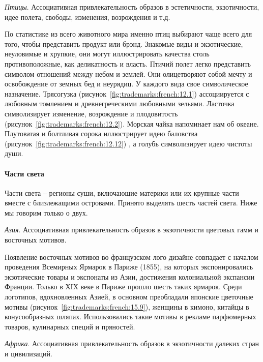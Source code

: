 \emph{Птицы}. Ассоциативная привлекательность образов в эстетичности,
  экзотичности, идее полета, свободы, изменения, возрождения и т.д.

  По статистике из всего животного мира именно птиц выбирают чаще всего для
  того, чтобы представить продукт или брэнд. Знакомые виды и экзотические,
  неуловимые и хрупкие, они могут иллюстрировать качества столь противоположные,
  как деликатность и власть. Птичий полет легко представить символом отношений
  между небом и землей. Они олицетворяют собой мечту и освобождение от земных бед
  и неурядиц. У каждого вида свое символическое назначение.  Трясогузка
  (рисунок~\ref{fig:trademarks:french:12.1}) ассоциируется с любовным томлением и
  древнегреческими любовными зельями. Ласточка символизирует изменение,
  возрождение и плодовитость (рисунок~\ref{fig:trademarks:french:12.2}). Морская
  чайка напоминает нам об океане. Плутоватая и болтливая сорока иллюстрирует идею
  баловства (рисунок~\ref{fig:trademarks:french:12.12}) , а голубь символизирует идею
  чистоты души.

\paragraph{Части света}

 Части света -- регионы суши, включающие материки или их
  крупные части вместе с близлежащими островами. Принято выделять шесть частей
  света. Ниже мы говорим только о двух.

\emph{Азия}. Ассоциативная привлекательность образов в экзотичности цветовых
    гамм и восточных мотивов.

    Появление восточных мотивов во французском лого дизайне совпадает с началом
    проведения Всемирных Ярмарок в Париже (1855), на которых экспонировались
    экзотические товары и экспонаты из Азии, достижения колониальной экспансии
    Франции. Только в ХIХ веке в Париже прошло шесть таких ярмарок. Среди логотипов,
    вдохновленных Азией, в основном преобладали японские цветочные мотивы
    (рисунок~\ref{fig:trademarks:french:15.9}), женщины в кимоно, китайцы в
    конусообразных шляпах.  Использовались такие мотивы в рекламе парфюмерных
    товаров, кулинарных специй и пряностей. %

\emph{Африка}. Ассоциативная привлекательность образов в экзотичности далеких
    стран и цивилизаций.

